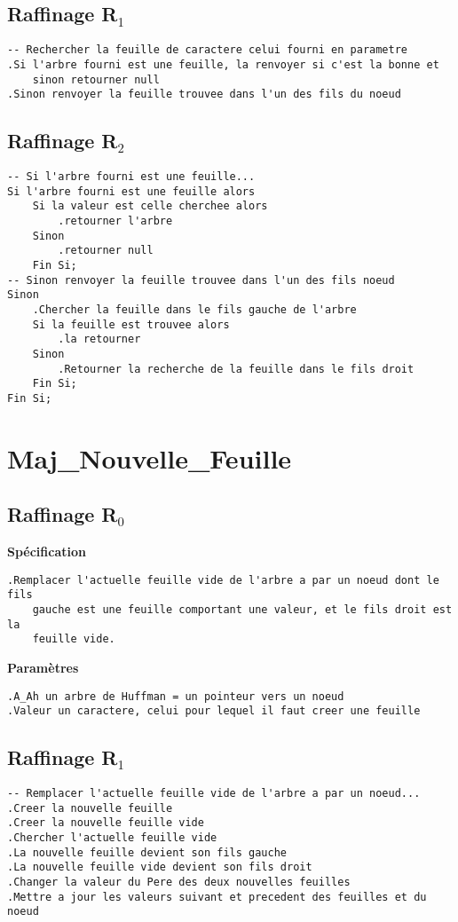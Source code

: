 \documentclass{book}
\begin{document}
\subsection{Raffinage R$_{1}$}
\begin{lstlisting}[frame=single]
-- Rechercher la feuille de caractere celui fourni en parametre
.Si l'arbre fourni est une feuille, la renvoyer si c'est la bonne et
	sinon retourner null
.Sinon renvoyer la feuille trouvee dans l'un des fils du noeud
\end{lstlisting}

\subsection{Raffinage R$_{2}$}
\begin{lstlisting}[frame=single]
-- Si l'arbre fourni est une feuille...
Si l'arbre fourni est une feuille alors
	Si la valeur est celle cherchee alors
		.retourner l'arbre
	Sinon
		.retourner null
	Fin Si;
-- Sinon renvoyer la feuille trouvee dans l'un des fils noeud
Sinon
	.Chercher la feuille dans le fils gauche de l'arbre
	Si la feuille est trouvee alors
		.la retourner
	Sinon
		.Retourner la recherche de la feuille dans le fils droit
	Fin Si;
Fin Si;
\end{lstlisting}

\section{Maj\_Nouvelle\_Feuille}

\subsection{Raffinage R$_{0}$}
\textbf{Spécification}
\begin{lstlisting}[frame=single]
.Remplacer l'actuelle feuille vide de l'arbre a par un noeud dont le fils
	gauche est une feuille comportant une valeur, et le fils droit est la 
	feuille vide.
\end{lstlisting}
\textbf{Paramètres}
\begin{lstlisting}[frame=single]
.A_Ah un arbre de Huffman = un pointeur vers un noeud
.Valeur un caractere, celui pour lequel il faut creer une feuille
\end{lstlisting}

\subsection{Raffinage R$_{1}$}
\begin{lstlisting}[frame=single]
-- Remplacer l'actuelle feuille vide de l'arbre a par un noeud...
.Creer la nouvelle feuille
.Creer la nouvelle feuille vide
.Chercher l'actuelle feuille vide
.La nouvelle feuille devient son fils gauche
.La nouvelle feuille vide devient son fils droit
.Changer la valeur du Pere des deux nouvelles feuilles
.Mettre a jour les valeurs suivant et precedent des feuilles et du noeud
\end{lstlisting}
\end{document}
